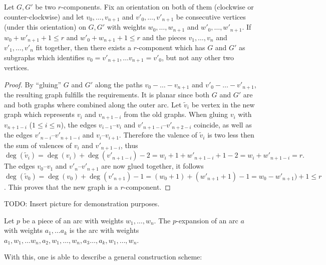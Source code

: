 \begin{lemma}\label{thm:fitting:arcs}
  Let $G, G'$ be two $r$-components. Fix an orientation on both of them (clockwise or counter-clockwise) and let $v_0, \dots, v_{n+1}$ and $v'_0, \dots, v'_{n+1}$ be consecutive vertices (under this orientation) on $G, G'$ with weights $w_0, \dots, w_{n+1}$ and $w'_0, \dots, w'_{n+1}$. If $w_0 + w'_{n+1} + 1 \leq r$ and $w'_0 + w_{n+1} + 1 \leq r$ and the pieces $v_1, \dots, v_n$ and $v'_1, \dots, v'_n$ fit together, then there exists a $r$-component which has $G$ and $G'$ as subgraphs which identifies $v_0 = v'_{n+1}, \dots v_{n+1} = v'_0$, but not any other two vertices.
  \begin{proof}
    By ``gluing'' $G$ and $G'$ along the paths $v_0 - \dots - v_{n+1}$ and $v'_0 - \dots - v'_{n+1}$, the resulting graph fulfills the requirements. It is planar since both $G$ and $G'$ are and both graphs where combined along the outer arc. Let $\tilde{v}_i$ be vertex in the new graph which represents $v_i$ and $v_{n+1-i}$ from the old graphs. When gluing $v_i$ with $v_{n+1-i}$ ($1 \leq i \leq n$), the edges $v_{i-1}$--$v_i$ and $v'_{n + 1 - i}$--$v'_{n + 2 - i}$ coincide, as well as the edges $v'_{n - i}$--$v'_{n + 1 - i}$ and $v_i$--$v_{i+1}$. Therefore the valence of $\tilde{v}_i$ is two less then the sum of valences of $v_i$ and $v'_{n+1-i}$, thus
    \begin{equation*}
      \deg(\tilde{v}_i) = \deg(v_i) + \deg(v'_{n+1-i}) - 2 = w_i + 1 + w'_{n + 1 - i} + 1 - 2 = w_i + w'_{n + 1 - i} = r.
    \end{equation*}
    The edges $v_0$--$v_1$ and $v'_n$--$v'_{n+1}$ are now glued together, it follows $\deg(\tilde{v}_0) = \deg(v_0) + \deg(v'_{n+1}) - 1 = (w_0 + 1) + (w'_{n+1} + 1) - 1 = w_0 - w'_{n+1}) + 1 \leq r$. This proves that the new graph is a $r$-component.
  \end{proof}
\end{lemma}

TODO: Insert picture for demonstration purposes.

\begin{definition}
  Let $p$ be a piece of an arc with weights $w_1, \dots, w_{n}$. The $p$-expansion of an arc $a$ with weights $a_1, \dots a_k$ is the arc with weights $a_1, w_1, \dots w_n, a_2, w_1, \dots, w_n, a_3 \dots, a_k, w_1, \dots, w_n$.
\end{definition}

With this, one is able to describe a general construction scheme:

